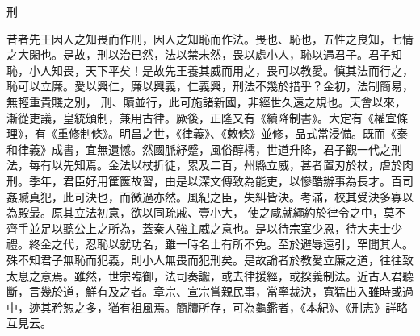 
\begin{pinyinscope}

 刑



 昔者先王因人之知畏而作刑，因人之知恥而作法。畏也、恥也，五性之良知，七情之大閑也。是故，刑以治已然，法以禁未然，畏以處小人，恥以遇君子。君子知恥，小人知畏，天下平矣！是故先王養其威而用之，畏可以教愛。慎其法而行之，恥可以立廉。愛以興仁，廉以興義，仁義興，刑法不幾於措乎？金初，法制簡易，無輕重貴賤之別，
 刑、贖並行，此可施諸新國，非經世久遠之規也。天會以來，漸從吏議，皇統頒制，兼用古律。厥後，正隆又有《續降制書》。大定有《權宜條理》，有《重修制條》。明昌之世，《律義》、《敕條》並修，品式當浸備。既而《泰和律義》成書，宜無遺憾。然國脈紓蹙，風俗醇樗，世道升降，君子觀一代之刑法，每有以先知焉。金法以杖折徒，累及二百，州縣立威，甚者置刃於杖，虐於肉刑。季年，君臣好用筐篋故習，由是以深文傅致為能吏，以慘酷辦事為長才。百司姦贓真犯，此可決也，而微過亦然。風紀之臣，失糾皆決。考滿，校其受決多寡以為殿最。原其立法初意，欲以同疏戚、壹小大，
 使之咸就繩約於律令之中，莫不齊手並足以聽公上之所為，蓋秦人強主威之意也。是以待宗室少恩，待大夫士少禮。終金之代，忍恥以就功名，雖一時名士有所不免。至於避辱遠引，罕聞其人。殊不知君子無恥而犯義，則小人無畏而犯刑矣。是故論者於教愛立廉之道，往往致太息之意焉。雖然，世宗臨御，法司奏讞，或去律援經，或揆義制法。近古人君聽斷，言幾於道，鮮有及之者。章宗、宣宗嘗親民事，當寧裁決，寬猛出入雖時或過中，迹其矜恕之多，猶有祖風焉。簡牘所存，可為龜鑑者，《本紀》、《刑志》詳略互見云。




\end{pinyinscope}
